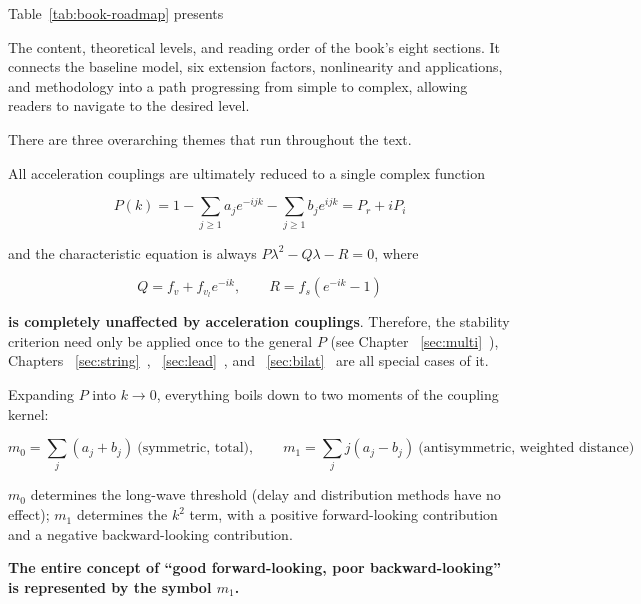 \documentclass[11pt,a4paper,openany]{book}
\numberwithin{equation}{chapter}
\numberwithin{figure}{chapter}
\numberwithin{table}{chapter}
\newcommand{\tabletext}[2]{%
  \par\smallskip\noindent
  Table~\ref{#1} presents #2
\par\smallskip
}
\begin{document}
\tabletext{tab:book-roadmap}{




The content, theoretical levels, and reading order of the book’s eight sections. It connects the baseline model, six extension factors, nonlinearity and applications, and methodology into a path progressing from simple to complex, allowing readers to navigate to the desired level.
}










There are three overarching themes that run throughout the text.










\begin{tcolorbox}[keybox,title=\textbf{Thread 1: Unified Algebraic Structure}]

All acceleration couplings are ultimately reduced to a single complex function

\[
P(k) = 1 - \sum_{j\ge1}a_j e^{-ijk} - \sum_{j\ge1}b_j e^{ijk} = P_r + iP_i
\]

and the characteristic equation is always $P\lambda^2 - Q\lambda - R = 0$, where

\[
Q = f_v + f_{v_l}e^{-ik},\qquad R = f_s\left(e^{-ik}-1\right)
\]







\textbf{is completely unaffected by acceleration couplings}. Therefore, the stability criterion need only be applied once to the general $P$ (see Chapter ~\ref{sec:multi}~), Chapters ~\ref{sec:string}~, ~\ref{sec:lead}~, and ~\ref{sec:bilat}~ are all special cases of it.







\end{tcolorbox}

\begin{tcolorbox}[keybox,title=\textbf{Clue 2: Zero-order moment tubes have long waves; first-order moment tubes have finite wavelengths}]

Expanding $P$ into $k\to0$, everything boils down to two moments of the coupling kernel:

\[
m_0 = \sum_j\left(a_j+b_j\right)\ \text{(symmetric, total)},
\qquad
m_1 = \sum_j j\left(a_j-b_j\right)\ \text{(antisymmetric, weighted distance)}
\]

$m_0$ determines the long-wave threshold (delay and distribution methods have no effect); $m_1$ determines the $k^2$ term, with a positive forward-looking contribution and a negative backward-looking contribution.




\textbf{The entire concept of “good forward-looking, poor backward-looking” is represented by the symbol $m_1$.}
\end{tcolorbox}
\end{document}
